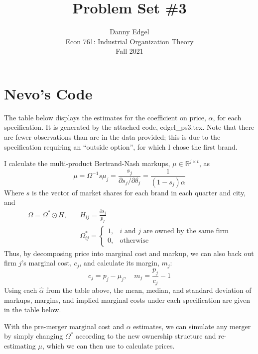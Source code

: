 \documentclass{article}
\newcommand{\R}{\mathbb{R}}
\newcommand{\pl}{\partial}
\begin{document}
\title{	Problem Set \#3 }
\author{ 	Danny Edgel 					        	      \\ 
			Econ 761: Industrial Organization Theory	\\
			Fall 2021						                      \\
		}
\maketitle\thispagestyle{empty}



\section{Nevo's Code}

The table below displays the estimates for the coefficient on price, $\alpha$, for each specification. It is generated by the attached code, edgel\_ps3.tex. Note that there are fewer observations than are in the data provided; this is due to the specification requiring an ``outside option'', for which I chose the first brand.
\begin{center}
        
\end{center}
I calculate the multi-product Bertrand-Nash markups, $\mu\in\R^{j\times t}$, as\[ 
        \mu = \Omega^{-1}s
        \mu_j = \frac{s_j}{\pl s_j / \pl\delta_j} = \frac{1}{(1-s_j)\alpha}
\]
Where ${s}$ is the vector of market shares for each brand in each quarter and city, and \begin{align*}
        \Omega = \Omega^*\odot H,\quad &H_{ij} = \frac{\pl s_j}{p_j}    \\
        &\Omega^*_{ij} =  \begin{cases} 1, & i\text{ and }j\text{ are owned by the same firm} \\ 0, &\text{otherwise} \end{cases}
\end{align*}
Thus, by decomposing price into marginal cost and markup, we can also back out firm $j$'s marginal cost, $c_j$, and calculate its margin, $m_j$: \[
        c_j = p_j - \mu_j,\quad m_j = \frac{p_j}{c_j} - 1
\]
Using each $\hat{\alpha}$ from the table above, the mean, median, and standard deviation of markups, margins, and implied marginal costs under each specification are given in the table below.
\begin{center}
        
\end{center}
With the pre-merger marginal cost and $\alpha$ estimates, we can simulate any merger by simply changing $\Omega^*$ according to the new ownership structure and re-estimating $\mu$, which we can then use to calculate prices.

\end{document}
